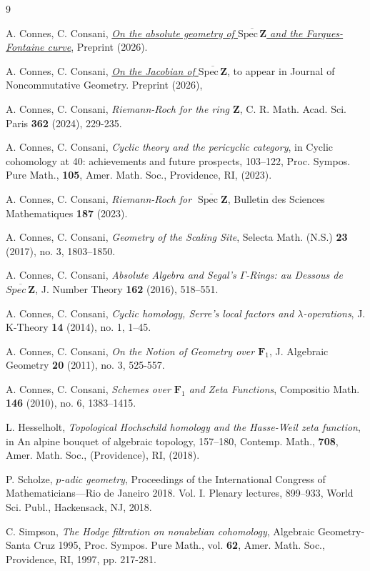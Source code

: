 \documentclass[11pt,a4paper]{article}
\begin{document}
\begin{thebibliography}{9}

 A. Connes, C. Consani, \emph{\href{https://arxiv.org/pdf/2606.06604}{On the absolute geometry of $\overline{\text{Spec}\,\mathbf Z}$ and the Fargues-Fontaine curve}}, Preprint (2026).  

 A. Connes, C. Consani, \emph{\href{https://arxiv.org/pdf/2602.15941}{On the Jacobian of $\overline{\text{Spec}\,\mathbf Z}$}}, to appear in Journal of Noncommutative Geometry. Preprint (2026), 

 A. Connes, C. Consani, \emph{Riemann-Roch for the ring $\mathbf{Z}$}, C. R. Math. Acad. Sci. Paris \textbf{362} (2024), 229-235.

 A. Connes,  C. Consani, \emph{Cyclic theory and the pericyclic category}, in  Cyclic cohomology at 40: achievements and future prospects, 103--122, Proc. Sympos. Pure Math., \textbf{105}, Amer. Math. Soc., Providence, RI, (2023). 

 A. Connes, C. Consani, \emph{Riemann-Roch for $\overline{\operatorname{Spec} \mathbf{Z}}$}, Bulletin des Sciences Mathematiques \textbf{187} (2023).

 A. Connes, C. Consani, \emph{Geometry of the Scaling Site}, Selecta Math. (N.S.) \textbf{23} (2017), no. 3, 1803--1850.

 A. Connes, C. Consani, \emph{Absolute Algebra and Segal's $\Gamma$-Rings: au Dessous de $\overline{Spec~\mathbf Z}$}, J. Number Theory {\bf 162} (2016), 518--551.

 A. Connes,  C. Consani, \emph{Cyclic homology, Serre's local factors and  $\lambda$-operations}, 
J. K-Theory  \textbf{14} (2014), no. 1, 1--45.

 A. Connes, C. Consani, \emph{On the Notion of Geometry over $\mathbf{F}_1$}, J. Algebraic Geometry \textbf{20} (2011), no. 3, 525-557.

 A. Connes, C. Consani, \emph{Schemes over $\mathbf F_1$ and Zeta Functions}, Compositio Math. {\bf 146} (2010), no. 6, 1383--1415. 

 L. Hesselholt, \emph{Topological Hochschild homology and the Hasse-Weil zeta function}, in An alpine bouquet of algebraic topology, 157–180, Contemp. Math., \textbf{708}, Amer. Math. Soc., (Providence), RI, (2018). 

P. Scholze,  \emph{$p$-adic geometry}, Proceedings of the International Congress of Mathematicians—Rio de Janeiro 2018. Vol. I. Plenary lectures, 899–933, World Sci. Publ., Hackensack, NJ, 2018.

 C. Simpson, \emph{The Hodge filtration on nonabelian cohomology}, Algebraic Geometry- Santa Cruz 1995, Proc. Sympos. Pure Math., vol. {\bf 62}, Amer. Math. Soc., Providence, RI, 1997, pp. 217-281.
\end{thebibliography}
\end{document}
